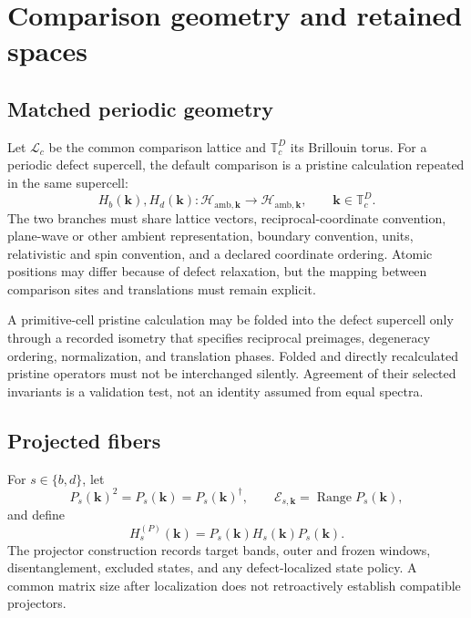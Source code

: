 \documentclass[11pt]{article}
\newenvironment{prospective}{\color{prospectivered}}{}
\begin{document}
\begin{prospective}
\section{Comparison geometry and retained spaces}

\subsection{Matched periodic geometry}
Let $\mathcal L_c$ be the common comparison lattice and $\mathbb T_c^D$ its Brillouin
torus. For a periodic defect supercell, the default comparison is a pristine calculation
repeated in the same supercell:
\begin{equation}
 H_b(\mathbf k),H_d(\mathbf k):\mathcal H_{\mathrm{amb},\mathbf k}
 \longrightarrow\mathcal H_{\mathrm{amb},\mathbf k},
 \qquad \mathbf k\in\mathbb T_c^D.
\end{equation}
The two branches must share lattice vectors, reciprocal-coordinate convention,
plane-wave or other ambient representation, boundary convention, units, relativistic
and spin convention, and a declared coordinate ordering. Atomic positions may differ
because of defect relaxation, but the mapping between comparison sites and translations
must remain explicit.

A primitive-cell pristine calculation may be folded into the defect supercell only
through a recorded isometry that specifies reciprocal preimages, degeneracy ordering,
normalization, and translation phases. Folded and directly recalculated pristine
operators must not be interchanged silently. Agreement of their selected invariants is a
validation test, not an identity assumed from equal spectra.

\subsection{Projected fibers}
For $s\in\{b,d\}$, let
\begin{equation}
 P_s(\mathbf k)^2=P_s(\mathbf k)=P_s(\mathbf k)^\dagger,
 \qquad \mathcal E_{s,\mathbf k}=\operatorname{Range}P_s(\mathbf k),
\end{equation}
and define
\begin{equation}
 H_s^{(P)}(\mathbf k)=P_s(\mathbf k)H_s(\mathbf k)P_s(\mathbf k).
\end{equation}
The projector construction records target bands, outer and frozen windows,
disentanglement, excluded states, and any defect-localized state policy. A common matrix
size after localization does not retroactively establish compatible projectors.


\end{prospective}
\end{document}
